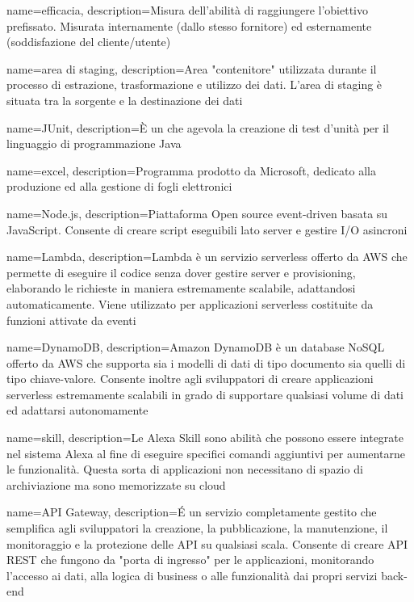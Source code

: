 {
	name=efficacia,
	description={Misura dell’abilità di raggiungere l’obiettivo prefissato. Misurata internamente (dallo stesso fornitore) ed esternamente (soddisfazione del cliente/utente)}
}

{
	name=area di staging,
	description={Area "contenitore" utilizzata durante il processo di estrazione, trasformazione e utilizzo dei dati. L'area di staging è situata tra la sorgente e la destinazione dei dati}
}

{
	name=JUnit,
	description={\`E un  che agevola la creazione di test d'unità per il linguaggio di programmazione Java}
}

{
	name=excel,
	description={Programma prodotto da Microsoft, dedicato alla produzione ed alla gestione di fogli elettronici}
}


{
  name=Node.js,
  description={Piattaforma Open source event-driven basata su JavaScript. Consente di creare script eseguibili lato server e gestire I/O asincroni}
}

{
  name=Lambda,
  description={Lambda è un servizio serverless offerto da AWS che permette di eseguire il codice senza dover gestire server e provisioning, elaborando le richieste in maniera estremamente scalabile, adattandosi automaticamente. Viene utilizzato per applicazioni serverless costituite da funzioni attivate da eventi}
}

{
  name=DynamoDB,
  description={Amazon DynamoDB è un database NoSQL offerto da AWS che supporta sia i modelli di dati di tipo documento sia quelli di tipo chiave-valore. Consente inoltre agli sviluppatori di creare applicazioni serverless estremamente scalabili in grado di supportare qualsiasi volume di dati ed adattarsi autonomamente}
}

{
  name=skill,
  description={Le Alexa Skill sono abilità che possono essere integrate nel sistema Alexa al fine di eseguire specifici comandi aggiuntivi per aumentarne le funzionalità. Questa sorta di applicazioni non necessitano di spazio di archiviazione ma sono memorizzate su cloud}
}

{
  name=API Gateway,
  description={\'E un servizio completamente gestito che semplifica agli sviluppatori la creazione, la pubblicazione, la manutenzione, il monitoraggio e la protezione delle API su qualsiasi scala. Consente di creare API REST che fungono da "porta di ingresso" per le applicazioni, monitorando l'accesso ai dati, alla logica di business o alle funzionalità dai propri servizi back-end}
}

